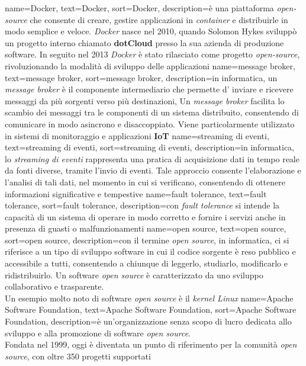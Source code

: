 {
    name={Docker},
    text=Docker,
    sort=Docker,
    description={è una piattaforma \textit{open-source} che consente di creare, gestire applicazioni in \textit{container} e distribuirle in modo semplice e veloce.
    \textit{Docker} nasce nel 2010, quando Solomon Hykes sviluppò un progetto interno chiamato \textbf{dotCloud} presso la sua azienda di produzione software. In seguito 
    nel 2013 \textit{Docker} è stato rilasciato come progetto \textit{open-source}, rivoluzionando la modalità di sviluppo delle applicazioni}
}
{
    name={message broker},
    text=message broker,
    sort=message broker,
    description={in informatica, un \textit{message broker} è  il componente intermediario che permette d' inviare e ricevere messaggi da più sorgenti verso più destinazioni,
    Un \textit{message broker} facilita lo scambio dei messaggi 
    tra le componenti di un sistema distribuito, consentendo di comunicare in modo asincrono e disaccoppiato.
    Viene particolarmente utilizzato in sistemi di monitoraggio e applicazioni \textbf{IoT}}
}
{
    name={streaming di eventi},
    text=streaming di eventi,
    sort=streaming di eventi,
    description={in informatica, lo \textit{streaming di eventi} rappresenta una pratica di acquisizione dati in tempo reale da fonti diverse, 
    tramite l'invio di eventi. Tale approccio consente l'elaborazione e l'analisi di tali dati, nel momento in cui si verificano,
    consentendo di ottenere informazioni significative e tempestive}
}
{
    name={fault tolerance},
    text=fault tolerance,
    sort=fault tolerance,
    description={con \textit{fault tolerance} si intende la capacità di un sistema di operare in modo corretto e fornire 
    i servizi anche in presenza di guasti o malfunzionamenti}
}
{
    name={open source},
    text=open source,
    sort=open source,
    description={con il termine \textit{open source}, in informatica, ci si riferisce a un tipo di sviluppo software in cui il codice sorgente è reso pubblico e accessibile a tutti,
    consentendo a chiunque di leggerlo, studiarlo, modificarlo e ridistribuirlo.
    Un software \textit{open source} è caratterizzato da uno sviluppo collaborativo e trasparente.\\
    Un esempio molto noto di software \textit{open source} è il \textit{kernel Linux}}
}
{
    name={Apache Software Foundation},
    text=Apache Software Foundation,
    sort=Apache Software Foundation,
    description={è un'organizzazione senza scopo di lucro dedicata allo sviluppo e alla promozione di software \textit{open source}.\\
    Fondata nel 1999, oggi è diventata un punto di riferimento per la comunità \textit{open source}, con oltre 350 progetti supportati}
}
